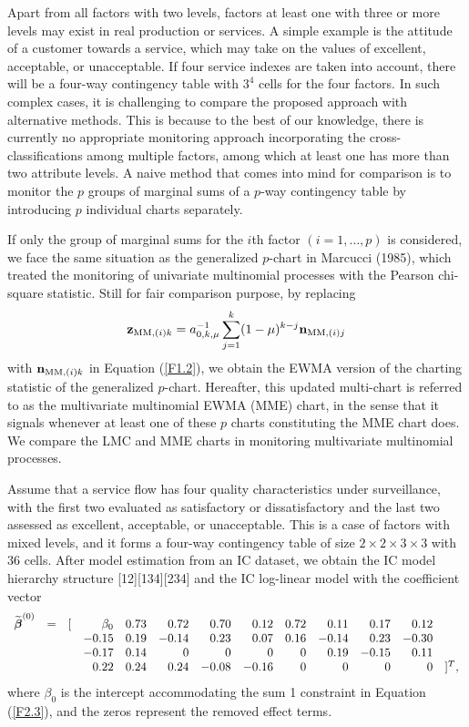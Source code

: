 Apart from all factors with two levels, factors at least one with three or more
levels may exist in real production or services. A simple example is the attitude of
a customer towards a service, which may take on the values of excellent, acceptable,
or unacceptable. If four service indexes are taken into account, there will be a
four-way contingency table with $3^4$ cells for the four factors. In such complex
cases, it is challenging to compare the proposed approach with alternative methods.
This is because to the best of our knowledge, there is currently no appropriate
monitoring approach incorporating the cross-classifications among multiple factors,
among which at least one has more than two attribute levels. A naive method that
comes into mind for comparison is to monitor the $p$ groups of marginal sums of a
$p$-way contingency table by introducing $p$ individual charts separately.

If only the group of marginal sums for the $i$th factor $(i=1,\ldots,p)$ is
considered, we face the same situation as the generalized $p$-chart in Marcucci
(1985), which treated the monitoring of univariate multinomial processes with the
Pearson chi-square statistic. Still for fair comparison purpose, by replacing
\[
{\bf z}_{\mathrm{MM},(i)k}=a_{0,k,\mu}^{-1}\sum_{j=1}^{k}(1-\mu)^{k-j} {\bf
n}_{\mathrm{MM},(i)j}
\]
with ${\bf n}_{\mathrm{MM},(i)k}$ in Equation (\ref{F1.2}), we obtain the EWMA
version of the charting statistic of the generalized $p$-chart. Hereafter, this
updated multi-chart is referred to as the multivariate multinomial EWMA (MME) chart,
in the sense that it signals whenever at least one of these $p$ charts constituting
the MME chart does. We compare the LMC and MME charts in monitoring multivariate
multinomial processes.

Assume that a service flow has four quality characteristics under surveillance, with
the first two evaluated as satisfactory or dissatisfactory and the last two assessed
as excellent, acceptable, or unacceptable. This is a case of factors with mixed
levels, and it forms a four-way contingency table of size $2\times2\times3\times3$
with 36 cells. After model estimation from an IC dataset, we obtain the IC model
hierarchy structure [12][134][234] and the IC log-linear model with the coefficient
vector
\begin{eqnarray}
\begin{array}{rrrrrrrrrrrrl}
\widetilde{\boldsymbol\beta}^{(0)} & = & [ & \beta_0 & 0.73 & 0.72 & 0.70 &
0.12 & 0.72 & 0.11 & 0.17 & 0.12 & \\
& & & -0.15 & 0.19 & -0.14 & 0.23 & 0.07 & 0.16 & -0.14 & 0.23 & -0.30 & \\
& & & -0.17 & 0.14 & 0 & 0 & 0 & 0 & 0.19 & -0.15 & 0.11 & \\
& & & 0.22 & 0.24 & 0.24 & -0.08 & -0.16 & 0 & 0 & 0 & 0 & ]^T,
\end{array}
\nonumber
\end{eqnarray}
where $\beta_0$ is the intercept accommodating the sum 1 constraint in Equation
(\ref{F2.3}), and the zeros represent the removed effect terms.

